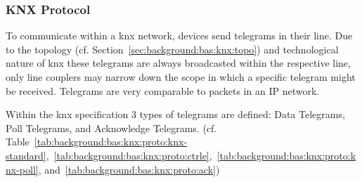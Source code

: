 


\subsubsection{KNX Protocol}
\label{sec:background:bas:knx:proto}

To communicate within a \gls{knx} network, devices send telegrams in their line. Due to the topology (cf. Section~\ref{sec:background:bas:knx:topo}) and technological nature of \gls{knx} these telegrams are always broadcasted within the respective line, only line couplers may narrow down the scope in which a specific telegram might be received. Telegrams are very comparable to packets in an IP network.

Within the \gls{knx} specification 3 types of telegrams are defined: Data Telegrams, Poll Telegrams, and Acknowledge Telegrams. (cf. Table~\ref{tab:background:bas:knx:proto:knx-standard},~\ref{tab:background:bas:knx:proto:ctrle},~\ref{tab:background:bas:knx:proto:knx-poll}, and~\ref{tab:background:bas:knx:proto:ack})

